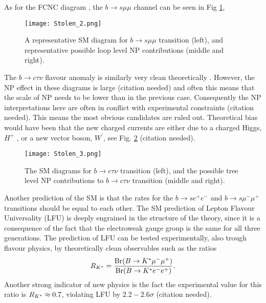 As for the FCNC diagram , the $b \rightarrow s \mu \mu$ channel can be seen in Fig \ref{fig:Flavour_D_2_Muon}, 
%
\begin{figure}[H]
	\centering
	\texttt{[image: Stolen\_2.png]}
	\caption{A representative SM diagram for $b \rightarrow s \mu \mu$ transition (left), and representative possible loop level NP
contributions (middle and right).}
	\label{fig:Flavour_D_2_Muon}
\end{figure}
%
The $b \rightarrow c \tau \nu$ flavour anomaly is similarly very clean theoretically \cite{Fajfer_2012}. However, the NP effect in these diagrams is large {\color{blue} (citation needed)} and often this means that the scale of NP needs to be lower than in the previous case. Consequently the NP interpretations here are often in conflict with experimental constraints {\color{blue} (citation needed)}.
%
This means the most obvious candidates are ruled out. Theoretical bias would have been that the new charged currents are either due to a charged Higgs, $H^+$ , or a new vector boson, $W^\prime$, see Fig. \ref{fig:Flavour_D_3_Tau} {\color{blue} (citation needed)}.
%
\begin{figure}[H]	
	\centering
	\texttt{[image: Stolen\_3.png]}
	\caption{The SM diagrams for $b \rightarrow c \tau \nu$ transition (left), and the possible tree level NP contributions to $b \rightarrow c \tau \nu$ transition (middle and right). }
	\label{fig:Flavour_D_3_Tau}
\end{figure}
%
Another prediction of the SM is that the rates for the  $b \rightarrow s e^+ e^-$ and  $b \rightarrow s \mu^- \mu^+$ transitions should be equal to each other.
%
The SM prediction of Lepton Flavour Universality (LFU) is deeply engrained in the structure of the theory, since it is a consequence of the fact that the electroweak gauge group is the same for all three generations. 
%
The prediction of LFU can be tested experimentally, also trough flavour physics, by theoretically clean observables such as the ratios  
%
\begin{equation}
R_{K^{\**}} = \frac{\text{Br}( B \rightarrow K^{\**} \mu^- \mu^+ )}{\text{Br} (  B \rightarrow K^{\**} e^- e^+  )}.
\end{equation}
% 
Another strong indicator of new physics is the fact the experimental value for this ratio is $R_{K^{\**}} \approx 0.7$, violating LFU by $2.2 - 2.6 \sigma$ {\color{blue} (citation needed)}.

